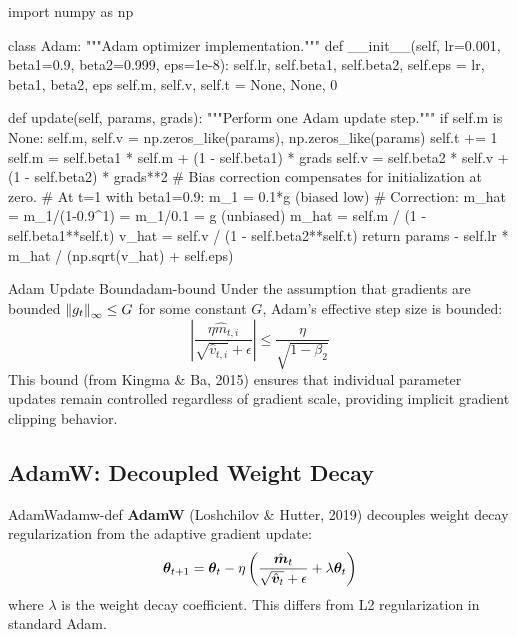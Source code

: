 \documentclass[../../main.tex]{subfiles}
\begin{document}
\begin{pythoncode}
import numpy as np

class Adam:
    """Adam optimizer implementation."""
    def __init__(self, lr=0.001, beta1=0.9, beta2=0.999, eps=1e-8):
        self.lr, self.beta1, self.beta2, self.eps = lr, beta1, beta2, eps
        self.m, self.v, self.t = None, None, 0

    def update(self, params, grads):
        """Perform one Adam update step."""
        if self.m is None:
            self.m, self.v = np.zeros_like(params), np.zeros_like(params)
        self.t += 1
        self.m = self.beta1 * self.m + (1 - self.beta1) * grads
        self.v = self.beta2 * self.v + (1 - self.beta2) * grads**2
        # Bias correction compensates for initialization at zero.
        # At t=1 with beta1=0.9: m_1 = 0.1*g (biased low)
        # Correction: m_hat = m_1/(1-0.9^1) = m_1/0.1 = g (unbiased)
        m_hat = self.m / (1 - self.beta1**self.t)
        v_hat = self.v / (1 - self.beta2**self.t)
        return params - self.lr * m_hat / (np.sqrt(v_hat) + self.eps)
\end{pythoncode}

\begin{theorem}{Adam Update Bound}{adam-bound}
Under the assumption that gradients are bounded $\left\lVert g_t \right\rVert_\infty \leq G$ for some constant $G$, Adam's effective step size is bounded:
\[
    \left|\frac{\eta \hat{m}_{t,i}}{\sqrt{\hat{v}_{t,i}} + \epsilon}\right| \leq \frac{\eta}{\sqrt{1-\beta_2}}
\]
This bound (from Kingma \& Ba, 2015) ensures that individual parameter updates remain controlled regardless of gradient scale, providing implicit gradient clipping behavior.
\end{theorem}

\subsection{AdamW: Decoupled Weight Decay}

\begin{definition}{AdamW}{adamw-def}
\textbf{AdamW} (Loshchilov \& Hutter, 2019) decouples weight decay regularization from the adaptive gradient update:
\[
    \boldsymbol{\theta}_{t+1} = \boldsymbol{\theta}_t - \eta \left( \frac{\hat{\boldsymbol{m}}_t}{\sqrt{\hat{\boldsymbol{v}}_t} + \epsilon} + \lambda \boldsymbol{\theta}_t \right)
\]
where $\lambda$ is the weight decay coefficient. This differs from L2 regularization in standard Adam.
\end{definition}
\end{document}
